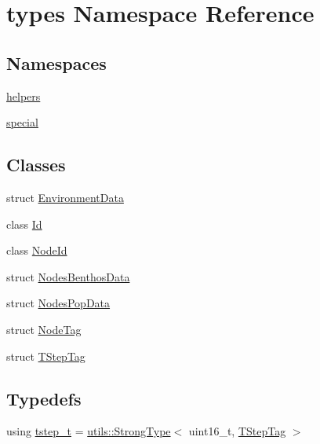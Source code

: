 \hypertarget{namespacetypes}{}\section{types Namespace Reference}
\label{namespacetypes}
\subsection*{Namespaces}
\begin{DoxyCompactItemize}
\item 
 \mbox{\hyperlink{namespacetypes_1_1helpers}{helpers}}
\item 
 \mbox{\hyperlink{namespacetypes_1_1special}{special}}
\end{DoxyCompactItemize}
\subsection*{Classes}
\begin{DoxyCompactItemize}
\item 
struct \mbox{\hyperlink{structtypes_1_1_environment_data}{Environment\+Data}}
\item 
class \mbox{\hyperlink{classtypes_1_1_id}{Id}}
\item 
class \mbox{\hyperlink{classtypes_1_1_node_id}{Node\+Id}}
\item 
struct \mbox{\hyperlink{structtypes_1_1_nodes_benthos_data}{Nodes\+Benthos\+Data}}
\item 
struct \mbox{\hyperlink{structtypes_1_1_nodes_pop_data}{Nodes\+Pop\+Data}}
\item 
struct \mbox{\hyperlink{structtypes_1_1_node_tag}{Node\+Tag}}
\item 
struct \mbox{\hyperlink{structtypes_1_1_t_step_tag}{T\+Step\+Tag}}
\end{DoxyCompactItemize}
\subsection*{Typedefs}
\begin{DoxyCompactItemize}
\item 
using \mbox{\hyperlink{namespacetypes_a9dc53a5ce11a196d82a6983030de8028}{tstep\+\_\+t}} = \mbox{\hyperlink{classutils_1_1_strong_type}{utils\+::\+Strong\+Type}}$<$ uint16\+\_\+t, \mbox{\hyperlink{structtypes_1_1_t_step_tag}{T\+Step\+Tag}} $>$
\end{DoxyCompactItemize}
